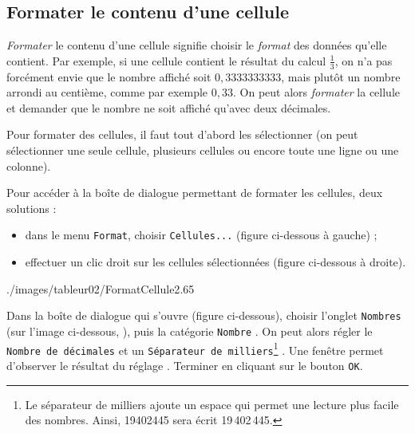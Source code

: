 \subsection{Formater le contenu d'une cellule}\label{Calc2FormaterCellule} 

\emph{Formater} le contenu d'une cellule signifie choisir le \emph{format} des données qu'elle contient. Par exemple, si une cellule contient le résultat du calcul $\frac{1}{3}$, on n'a pas forcément envie que le nombre affiché soit $0,3333333333$, mais plutôt un nombre arrondi au centième, comme par exemple $0,33$. On peut alors \emph{formater} la cellule et demander que le nombre ne soit affiché qu'avec deux décimales.

Pour formater des cellules, il faut tout d'abord les sélectionner (on peut sélectionner une seule cellule, plusieurs cellules ou encore toute une ligne ou une colonne).



Pour accéder à la boîte de dialogue permettant de formater les cellules, deux solutions :
\begin{itemize}
\item dans le menu \texttt{Format}, choisir \texttt{Cellules...} (figure ci-dessous à gauche) ;    
\item effectuer un clic droit sur les cellules sélectionnées (figure ci-dessous à droite).
\end{itemize}

%  
              {./images/tableur02/FormatCellule2}{.65\textwidth}

Dans la boîte de dialogue qui s'ouvre (figure ci-dessous), choisir l'onglet \texttt{Nombres} (sur l'image ci-dessous, ), puis la catégorie \texttt{Nombre} . On peut alors régler le \texttt{Nombre de décimales}  et un \texttt{Séparateur de milliers}\footnote{Le séparateur de milliers ajoute un espace qui permet une lecture plus facile des nombres. Ainsi, 19402445 sera écrit 19\,402\,445.} . Une fenêtre permet d'observer le résultat du réglage . Terminer en cliquant sur le bouton \texttt{OK}.              


